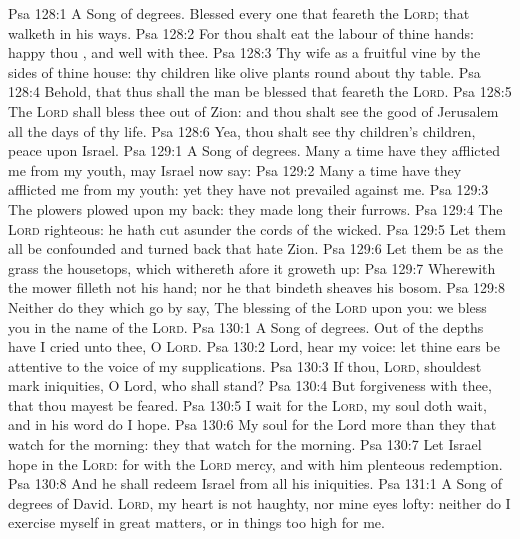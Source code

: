 \vs Psa 128:1 A Song of degrees. Blessed  every one that feareth the \textsc{Lord}; that walketh in his ways.
\vs Psa 128:2 For thou shalt eat the labour of thine hands: happy  thou , and  well with thee.
\vs Psa 128:3 Thy wife  as a fruitful vine by the sides of thine house: thy children like olive plants round about thy table.
\vs Psa 128:4 Behold, that thus shall the man be blessed that feareth the \textsc{Lord}.
\vs Psa 128:5 The \textsc{Lord} shall bless thee out of Zion: and thou shalt see the good of Jerusalem all the days of thy life.
\vs Psa 128:6 Yea, thou shalt see thy children's children,  peace upon Israel.
\vs Psa 129:1 A Song of degrees. Many a time have they afflicted me from my youth, may Israel now say:
\vs Psa 129:2 Many a time have they afflicted me from my youth: yet they have not prevailed against me.
\vs Psa 129:3 The plowers plowed upon my back: they made long their furrows.
\vs Psa 129:4 The \textsc{Lord}  righteous: he hath cut asunder the cords of the wicked.
\vs Psa 129:5 Let them all be confounded and turned back that hate Zion.
\vs Psa 129:6 Let them be as the grass  the housetops, which withereth afore it groweth up:
\vs Psa 129:7 Wherewith the mower filleth not his hand; nor he that bindeth sheaves his bosom.
\vs Psa 129:8 Neither do they which go by say, The blessing of the \textsc{Lord}  upon you: we bless you in the name of the \textsc{Lord}.
\vs Psa 130:1 A Song of degrees. Out of the depths have I cried unto thee, O \textsc{Lord}.
\vs Psa 130:2 Lord, hear my voice: let thine ears be attentive to the voice of my supplications.
\vs Psa 130:3 If thou, \textsc{Lord}, shouldest mark iniquities, O Lord, who shall stand?
\vs Psa 130:4 But  forgiveness with thee, that thou mayest be feared.
\vs Psa 130:5 I wait for the \textsc{Lord}, my soul doth wait, and in his word do I hope.
\vs Psa 130:6 My soul  for the Lord more than they that watch for the morning:  they that watch for the morning.
\vs Psa 130:7 Let Israel hope in the \textsc{Lord}: for with the \textsc{Lord}  mercy, and with him  plenteous redemption.
\vs Psa 130:8 And he shall redeem Israel from all his iniquities.
\vs Psa 131:1 A Song of degrees of David. \textsc{Lord}, my heart is not haughty, nor mine eyes lofty: neither do I exercise myself in great matters, or in things too high for me.
